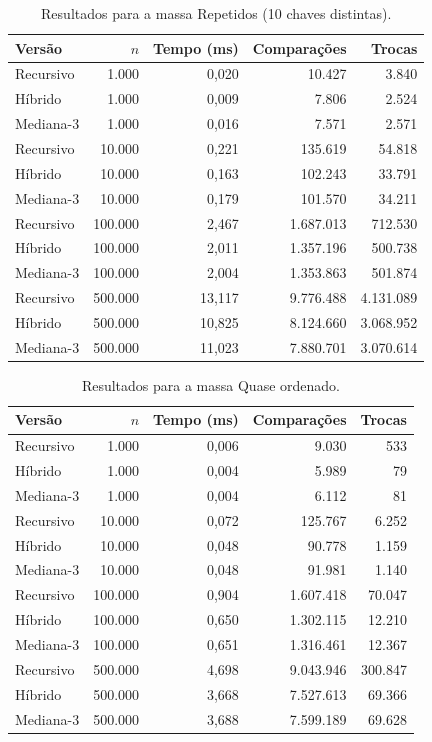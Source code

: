 \begin{table}[H]
\centering
\caption{Resultados para a massa Repetidos (10 chaves distintas).}
\label{tab:repetidos}
\begin{tabular}{lrrrr}
\hline
\textbf{Versão} & \textbf{$n$} & \textbf{Tempo (ms)} & \textbf{Comparações} & \textbf{Trocas} \\
\hline
Recursivo & 1.000 & 0,020 & 10.427 & 3.840 \\
Híbrido & 1.000 & 0,009 & 7.806 & 2.524 \\
Mediana-3 & 1.000 & 0,016 & 7.571 & 2.571 \\
\hline
Recursivo & 10.000 & 0,221 & 135.619 & 54.818 \\
Híbrido & 10.000 & 0,163 & 102.243 & 33.791 \\
Mediana-3 & 10.000 & 0,179 & 101.570 & 34.211 \\
\hline
Recursivo & 100.000 & 2,467 & 1.687.013 & 712.530 \\
Híbrido & 100.000 & 2,011 & 1.357.196 & 500.738 \\
Mediana-3 & 100.000 & 2,004 & 1.353.863 & 501.874 \\
\hline
Recursivo & 500.000 & 13,117 & 9.776.488 & 4.131.089 \\
Híbrido & 500.000 & 10,825 & 8.124.660 & 3.068.952 \\
Mediana-3 & 500.000 & 11,023 & 7.880.701 & 3.070.614 \\
\hline
\end{tabular}
\end{table}

\begin{table}[H]
\centering
\caption{Resultados para a massa Quase ordenado.}
\label{tab:quaseordenado}
\begin{tabular}{lrrrr}
\hline
\textbf{Versão} & \textbf{$n$} & \textbf{Tempo (ms)} & \textbf{Comparações} & \textbf{Trocas} \\
\hline
Recursivo & 1.000 & 0,006 & 9.030 & 533 \\
Híbrido & 1.000 & 0,004 & 5.989 & 79 \\
Mediana-3 & 1.000 & 0,004 & 6.112 & 81 \\
\hline
Recursivo & 10.000 & 0,072 & 125.767 & 6.252 \\
Híbrido & 10.000 & 0,048 & 90.778 & 1.159 \\
Mediana-3 & 10.000 & 0,048 & 91.981 & 1.140 \\
\hline
Recursivo & 100.000 & 0,904 & 1.607.418 & 70.047 \\
Híbrido & 100.000 & 0,650 & 1.302.115 & 12.210 \\
Mediana-3 & 100.000 & 0,651 & 1.316.461 & 12.367 \\
\hline
Recursivo & 500.000 & 4,698 & 9.043.946 & 300.847 \\
Híbrido & 500.000 & 3,668 & 7.527.613 & 69.366 \\
Mediana-3 & 500.000 & 3,688 & 7.599.189 & 69.628 \\
\hline
\end{tabular}
\end{table}

